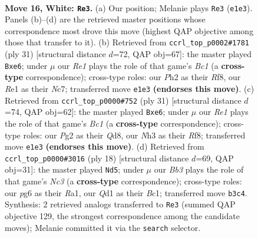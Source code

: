 \documentclass[11pt]{article}
\begin{document}
\clearpage

\begin{figure}[p]\centering
\begin{subfigure}{0.46\textwidth}\centering
\resizebox{\linewidth}{!}{%
\newchessgame
\chessboard[
  setfen={r2qk2r/ppp1b3/nn3pp1/1N1p3p/P2Pb3/1B5N/RPP2PPP/2BQR1K1 w kq - 8 16},
  showmover=false,
  pgfstyle=straightmove, color=movearrow, markmove={e1-e3}
]}
\caption{}
\end{subfigure}\hfill
\begin{subfigure}{0.46\textwidth}\centering
\resizebox{\linewidth}{!}{%
\newchessgame
\chessboard[
  setfen={2bq1rk1/2n2pbp/pr1pPnp1/2p5/2B1PP2/1PN2N2/2P3PP/R1B1QR1K b - - 0 16},
  showmover=false,
  pgfstyle=straightmove, color=movearrow, markmove={c8-e6}
]}
\caption{}
\end{subfigure}
\\[4pt]
\begin{subfigure}{0.46\textwidth}\centering
\resizebox{\linewidth}{!}{%
\newchessgame
\chessboard[
  setfen={2bq1rk1/2n2pbp/pr1pPnp1/2p5/4PP2/2NB1N2/1PP3PP/R1B1QR1K b - - 0 16},
  showmover=false,
  pgfstyle=straightmove, color=movearrow, markmove={c8-e6}
]}
\caption{}
\end{subfigure}\hfill
\begin{subfigure}{0.46\textwidth}\centering
\resizebox{\linewidth}{!}{%
\newchessgame
\chessboard[
  setfen={2rqkb1r/pp3pp1/2npbn1p/4p3/2B1P3/2N2N1P/PPP1QPP1/R1B1K2R w KQk - 3 10},
  showmover=false,
  pgfstyle=straightmove, color=movearrow, markmove={c3-d5}
]}
\caption{}
\end{subfigure}
\caption{\textbf{Move 16, White: \texttt{Re3}.} (a) Our position; Melanie plays \texttt{Re3} (\texttt{e1e3}). Panels (b)--(d) are the retrieved master positions whose correspondence most drove this move (highest QAP objective among those that transfer to it). (b) Retrieved from \texttt{ccrl\_top\_p0002\#1781} (ply 31) [structural distance $d$=72, QAP obj=67]: the master played \texttt{Bxe6}; under $\mu$ our \emph{Re1} plays the role of that game's \emph{Bc1} (a \textbf{cross-type} correspondence); cross-type roles: our \emph{P}h2 as their \emph{R}f8, our \emph{R}e1 as their \emph{N}c7; transferred move \texttt{e1e3} \textbf{(endorses this move)}. (c) Retrieved from \texttt{ccrl\_top\_p0000\#752} (ply 31) [structural distance $d$=74, QAP obj=62]: the master played \texttt{Bxe6}; under $\mu$ our \emph{Re1} plays the role of that game's \emph{Bc1} (a \textbf{cross-type} correspondence); cross-type roles: our \emph{P}g2 as their \emph{Q}d8, our \emph{N}h3 as their \emph{R}f8; transferred move \texttt{e1e3} \textbf{(endorses this move)}. (d) Retrieved from \texttt{ccrl\_top\_p0000\#3016} (ply 18) [structural distance $d$=69, QAP obj=31]: the master played \texttt{Nd5}; under $\mu$ our \emph{Bb3} plays the role of that game's \emph{Nc3} (a \textbf{cross-type} correspondence); cross-type roles: our \emph{p}g6 as their \emph{R}a1, our \emph{Q}d1 as their \emph{B}c1; transferred move \texttt{b3c4}. Synthesis: 2 retrieved analogs transferred to \texttt{Re3} (summed QAP objective 129, the strongest correspondence among the candidate moves); Melanie committed it via the \texttt{search} selector.}
\label{fig:thought-m30}
\end{figure}
\end{document}
